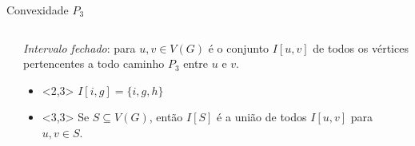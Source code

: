 \begin{frame}{Convexidade $P_3$}
\begin{columns}[T]
\begin{column}{0.5\textwidth}
            \end{column}
            \begin{column}{0.5\textwidth}
                  \emph{Intervalo fechado}: para $u,v \in V(G)$ é o conjunto $I[u, v]$ de todos os vértices pertencentes a todo caminho $P_3$ entre $u$ e $v$.

                  \begin{itemize}
                        \item<{2,3}> $I[i,g]=\{i,g,h\}$
                        \item<{3,3}> Se $S \subseteq V(G)$, então $I[S]$ é a união de todos $I[u, v]$ para $u, v \in S$.
                  \end{itemize}
            \end{column}
      \end{columns}
\end{frame}


